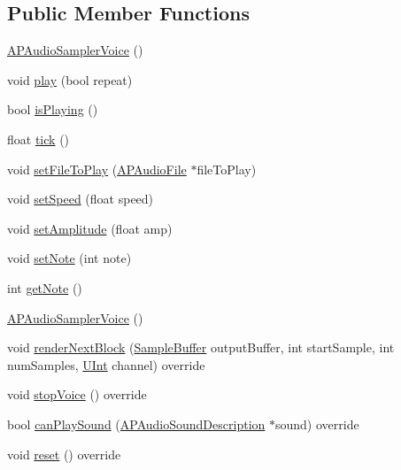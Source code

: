 \subsection*{Public Member Functions}
\begin{DoxyCompactItemize}
\item 
\hyperlink{class_a_p_audio_sampler_voice_a6ac63a6c78e0e581b5a5b7ab5aa8dc6c}{A\+P\+Audio\+Sampler\+Voice} ()
\item 
void \hyperlink{class_a_p_audio_sampler_voice_ac0a8118282d9e2edf695c6c3c683eac0}{play} (bool repeat)
\item 
bool \hyperlink{class_a_p_audio_sampler_voice_a8f0b92e13673db88b65411d03368f5a6}{is\+Playing} ()
\item 
float \hyperlink{class_a_p_audio_sampler_voice_a54a619f1d79b8ec8026a59865736100c}{tick} ()
\item 
void \hyperlink{class_a_p_audio_sampler_voice_a20cb748c04da47d05810393c8cc7af27}{set\+File\+To\+Play} (\hyperlink{class_a_p_audio_file}{A\+P\+Audio\+File} $\ast$file\+To\+Play)
\item 
void \hyperlink{class_a_p_audio_sampler_voice_a77f7d566474366f142f1782305e1df60}{set\+Speed} (float speed)
\item 
void \hyperlink{class_a_p_audio_sampler_voice_a6d56d1517396372a76a06efc98c81095}{set\+Amplitude} (float amp)
\item 
void \hyperlink{class_a_p_audio_sampler_voice_a9cca9818b0ed91df459e3ac6fdbe4ba3}{set\+Note} (int note)
\item 
int \hyperlink{class_a_p_audio_sampler_voice_ae596fdf1bd14a35a18cd3d61761301c3}{get\+Note} ()
\item 
\hyperlink{class_a_p_audio_sampler_voice_a6ac63a6c78e0e581b5a5b7ab5aa8dc6c}{A\+P\+Audio\+Sampler\+Voice} ()
\item 
void \hyperlink{class_a_p_audio_sampler_voice_a2771cb306e331a458cea4283048c374c}{render\+Next\+Block} (\hyperlink{_a_p_audio_module_8h_a2c2f997fdc6b0e88b3723fb20dc502f0}{Sample\+Buffer} output\+Buffer, int start\+Sample, int num\+Samples, \hyperlink{_a_p_audio_module_8h_a9cc0620fb2e91b51587c6936060d4161}{U\+Int} channel) override
\item 
void \hyperlink{class_a_p_audio_sampler_voice_af251bd2529b4472729db61d54753cc56}{stop\+Voice} () override
\item 
bool \hyperlink{class_a_p_audio_sampler_voice_af9959b4be2689341d32e697b5cef7ab5}{can\+Play\+Sound} (\hyperlink{class_a_p_audio_sound_description}{A\+P\+Audio\+Sound\+Description} $\ast$sound) override
\item 
void \hyperlink{class_a_p_audio_sampler_voice_acc47dbbd5d5835092c4806d245c53188}{reset} () override
\end{DoxyCompactItemize}


